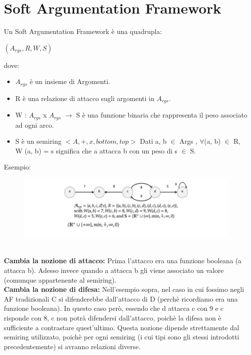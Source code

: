 \section{Soft Argumentation Framework}
Un Soft Argumentation Framework è una quadrupla:
\begin{center}
    $(A_{rgs} , R, W, S)$
\end{center}
dove:
\begin{itemize}
    \item $A_{rgs}$ è un insieme di Argomenti.
    \item R è una relazione di attacco sugli argomenti in $A_{rgs}$.
    \item W : $A_{rgs}$ x $A_{rgs}$ $\rightarrow$ S è una funzione binaria che rappresenta il peso associato ad ogni arco.
    \item S è un semiring $< A, +, x, bottom, top >$ Dati a, b $\in$ Args , $\forall$(a, b) $\in$ R, W (a, b) = s significa che a attacca b con un peso di s $\in$ S.
\end{itemize}
 Esempio:
\begin{figure}[htp]
	\centering
    \includegraphics[width=13cm, keepaspectratio]{img/Cap6/SoftA.png}
\end{figure}
\\\textbf{Cambia la nozione di attacco:} Prima l’attacco era una funzione booleana (a attacca b). Adesso invece quando a attacca b gli viene associato un valore (comunque appartenente al semiring).
\\\textbf{Cambia la nozione di difesa:} Nell’esempio sopra, nel caso in cui fossimo negli AF tradizionali C si difenderebbe dall’attacco di D (perchè ricordiamo era una funzione booleana). In questo caso però, essendo che d attacca c con 9 e c risponde con 8, c non potrà difendersi dall’attacco, poichè la difesa non è sufficiente a contrastare quest’ultimo. Questa nozione dipende strettamente dal semiring utilizzato, poichè per ogni semiring (i cui tipi sono gli stessi introdotti precedentemente) si avranno relazioni diverse.
